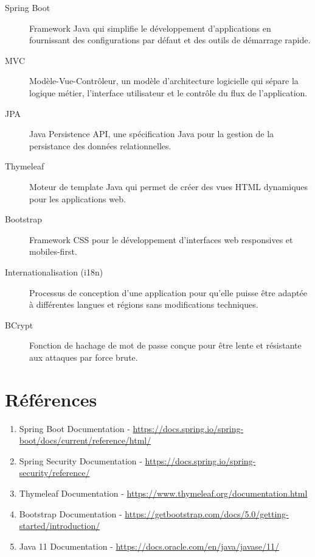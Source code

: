 \documentclass[12pt,a4paper]{report}
\begin{document}
\begin{description}
    \item[Spring Boot] Framework Java qui simplifie le développement d'applications en fournissant des configurations par défaut et des outils de démarrage rapide.
    \item[MVC] Modèle-Vue-Contrôleur, un modèle d'architecture logicielle qui sépare la logique métier, l'interface utilisateur et le contrôle du flux de l'application.
    \item[JPA] Java Persistence API, une spécification Java pour la gestion de la persistance des données relationnelles.
    \item[Thymeleaf] Moteur de template Java qui permet de créer des vues HTML dynamiques pour les applications web.
    \item[Bootstrap] Framework CSS pour le développement d'interfaces web responsives et mobiles-first.
    \item[Internationalisation (i18n)] Processus de conception d'une application pour qu'elle puisse être adaptée à différentes langues et régions sans modifications techniques.
    \item[BCrypt] Fonction de hachage de mot de passe conçue pour être lente et résistante aux attaques par force brute.
\end{description}

\section{Références}

\begin{enumerate}
    \item Spring Boot Documentation - \url{https://docs.spring.io/spring-boot/docs/current/reference/html/}
    \item Spring Security Documentation - \url{https://docs.spring.io/spring-security/reference/}
    \item Thymeleaf Documentation - \url{https://www.thymeleaf.org/documentation.html}
    \item Bootstrap Documentation - \url{https://getbootstrap.com/docs/5.0/getting-started/introduction/}
    \item Java 11 Documentation - \url{https://docs.oracle.com/en/java/javase/11/}
\end{enumerate}
\end{document}
